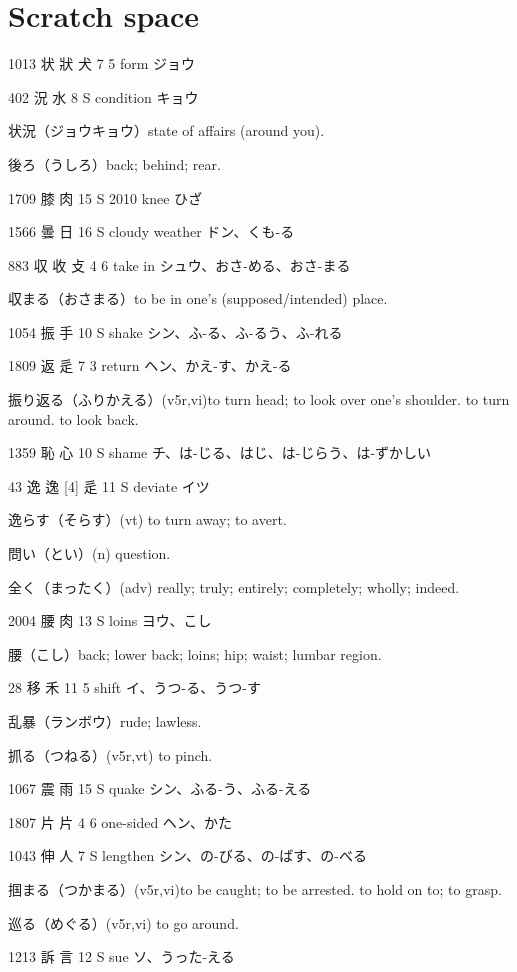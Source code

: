 \chapter{Scratch space}

1013	状	狀	犬	7	5		form	ジョウ

402	況		水	8	S		condition	キョウ

状況（ジョウキョウ）state of affairs (around you).

後ろ（うしろ）back; behind; rear.

1709	膝		肉	15	S	2010	knee	ひざ

1566	曇		日	16	S		cloudy weather	ドン、くも-る

883	収	收	攴	4	6		take in	シュウ、おさ-める、おさ-まる

収まる（おさまる）to be in one's (supposed/intended) place.

1054	振		手	10	S		shake	シン、ふ-る、ふ-るう、ふ-れる

1809	返		辵	7	3		return	ヘン、かえ-す、かえ-る

振り返る（ふりかえる）(v5r,vi)to turn head; to look over one's shoulder. to turn around. to look back.

1359	恥		心	10	S		shame	チ、は-じる、はじ、は-じらう、は-ずかしい

43	逸	逸 [4]	辵	11	S		deviate	イツ

逸らす（そらす）(vt) to turn away; to avert.

問い（とい）(n) question.

全く（まったく）(adv) really; truly; entirely; completely; wholly; indeed.

2004	腰		肉	13	S		loins	ヨウ、こし

腰（こし）back; lower back; loins; hip; waist; lumbar region.

28	移		禾	11	5		shift	イ、うつ-る、うつ-す

乱暴（ランボウ）rude; lawless.

抓る（つねる）(v5r,vt) to pinch.

1067	震		雨	15	S		quake	シン、ふる-う、ふる-える

1807	片		片	4	6		one-sided	ヘン、かた

1043	伸		人	7	S		lengthen	シン、の-びる、の-ばす、の-べる

掴まる（つかまる）(v5r,vi)to be caught; to be arrested. to hold on to; to grasp.

巡る（めぐる）(v5r,vi) to go around.

1213	訴		言	12	S		sue	ソ、うった-える

